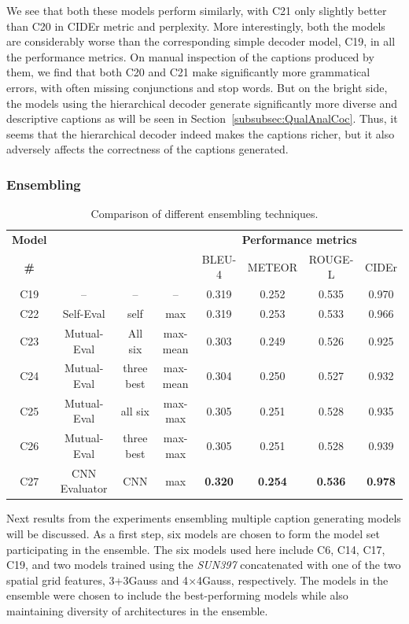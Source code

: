 We see that both these models perform similarly, with C21 only slightly better
than C20 in CIDEr metric and perplexity.
More interestingly, both the models are considerably worse than the
corresponding simple decoder model, C19, in all the performance metrics.
On manual inspection of the captions produced by them, we find that both C20 and
C21 make significantly more grammatical errors, with often missing conjunctions
and stop words.
But on the bright side, the models using the hierarchical decoder generate
significantly more diverse and descriptive captions as will be seen in
Section~\ref{subsubsec:QualAnalCoc}.
Thus, it seems that the hierarchical decoder indeed makes the captions richer,
but it also adversely affects the correctness of the captions generated.

\subsubsection{Ensembling}
\begin{table}[tbh]
  \centering
  \newcommand{\bs}{\small}
  \begin{adjustbox}{center}
  \begin{tabular}{|c|c|c|c|c|c|c|c|}
    \hline
    \bf Model & \bf \multirow{2}{*}{Method} & \bf \multirow{2}{*}{Evaluators}&
    \bf \multirow{2}{*}{Eval type}  & \multicolumn{4}{c|}{\bf Performance metrics}\\
    \cline{5-8}
    \bf \# & & & &\bs BLEU-4 &\bs METEOR &\bs ROUGE-L &\bs CIDEr\\\hline
    C19 & --    & -- & -- & 0.319 & 0.252 & 0.535 & 0.970\\\hline
    C22 & Self-Eval & self      & max      & 0.319 & 0.253 & 0.533 & 0.966\\\hline
    C23 & Mutual-Eval      &  All six  & max-mean & 0.303 & 0.249 & 0.526 & 0.925\\
    C24 & Mutual-Eval      &three best & max-mean & 0.304 & 0.250 & 0.527 &
    0.932\\\cline{3-8}
    C25 & Mutual-Eval      & all six & max-max  & 0.305 & 0.251 & 0.528 & 0.935\\
    C26 & Mutual-Eval      & three best & max-max  & 0.305 & 0.251 & 0.528 & 0.939\\\hline
    C27 & CNN Evaluator    & CNN  & max&\bf0.320&\bf0.254 &\bf0.536 &\bf0.978\\\hline
  \end{tabular}
  \end{adjustbox}
  \caption{Comparison of different ensembling techniques.}
  \label{tab:resEnsembCocValset}
\end{table}
Next results from the experiments ensembling multiple caption generating models
will be discussed.
As a first step, six models are chosen to form the model set participating in
the ensemble.
The six models used here include C6, C14, C17, C19, and two models trained using
the \emph{SUN397} concatenated with one of the two spatial grid features, 3+3Gauss
and 4$\times$4Gauss, respectively.
The models in the ensemble were chosen to include the best-performing models
while also maintaining diversity of architectures in the ensemble.

